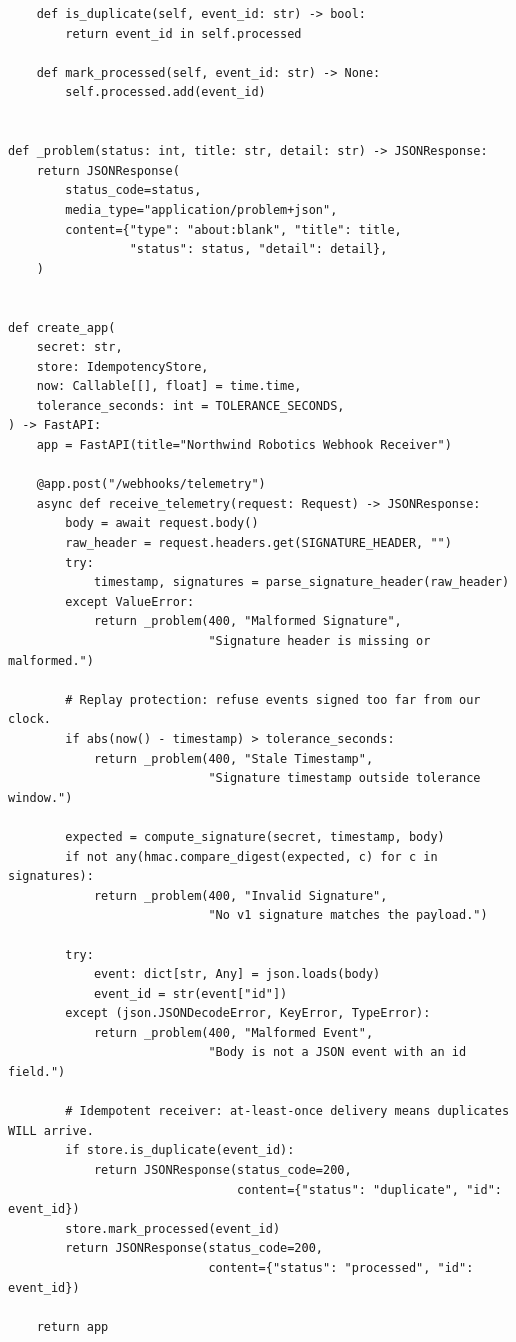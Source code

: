 \begin{verbatim}
    def is_duplicate(self, event_id: str) -> bool:
        return event_id in self.processed

    def mark_processed(self, event_id: str) -> None:
        self.processed.add(event_id)


def _problem(status: int, title: str, detail: str) -> JSONResponse:
    return JSONResponse(
        status_code=status,
        media_type="application/problem+json",
        content={"type": "about:blank", "title": title,
                 "status": status, "detail": detail},
    )


def create_app(
    secret: str,
    store: IdempotencyStore,
    now: Callable[[], float] = time.time,
    tolerance_seconds: int = TOLERANCE_SECONDS,
) -> FastAPI:
    app = FastAPI(title="Northwind Robotics Webhook Receiver")

    @app.post("/webhooks/telemetry")
    async def receive_telemetry(request: Request) -> JSONResponse:
        body = await request.body()
        raw_header = request.headers.get(SIGNATURE_HEADER, "")
        try:
            timestamp, signatures = parse_signature_header(raw_header)
        except ValueError:
            return _problem(400, "Malformed Signature",
                            "Signature header is missing or malformed.")

        # Replay protection: refuse events signed too far from our clock.
        if abs(now() - timestamp) > tolerance_seconds:
            return _problem(400, "Stale Timestamp",
                            "Signature timestamp outside tolerance window.")

        expected = compute_signature(secret, timestamp, body)
        if not any(hmac.compare_digest(expected, c) for c in signatures):
            return _problem(400, "Invalid Signature",
                            "No v1 signature matches the payload.")

        try:
            event: dict[str, Any] = json.loads(body)
            event_id = str(event["id"])
        except (json.JSONDecodeError, KeyError, TypeError):
            return _problem(400, "Malformed Event",
                            "Body is not a JSON event with an id field.")

        # Idempotent receiver: at-least-once delivery means duplicates WILL arrive.
        if store.is_duplicate(event_id):
            return JSONResponse(status_code=200,
                                content={"status": "duplicate", "id": event_id})
        store.mark_processed(event_id)
        return JSONResponse(status_code=200,
                            content={"status": "processed", "id": event_id})

    return app
\end{verbatim}

